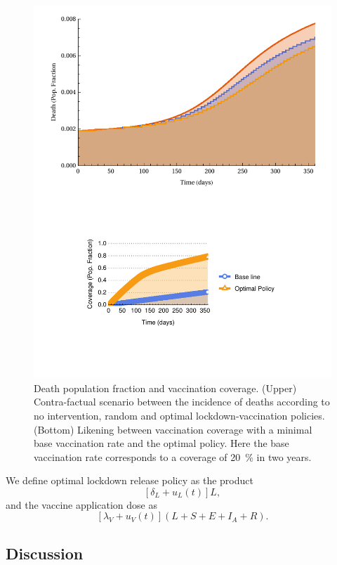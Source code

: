 \begin{figure}
    \centering
    \includegraphics[width=0.7\linewidth]{figs/deathsVaccinationCoverage}
    \caption{Death population fraction and vaccination coverage.
    (Upper) Contra-factual scenario between the incidence of deaths according to
    no intervention, random and optimal lockdown-vaccination policies.
    (Bottom) Likening between vaccination coverage with a minimal base
    vaccination rate and the optimal policy. Here the base vaccination rate
    corresponds to a coverage of \SI{20}{\percent} in two years.
}
    \label{fig:deathsvaccinationcoverage}
\end{figure}

\begin{rmk}
    We define optimal lockdown release policy as the product
    $$[\delta_L + u_L(t)] L,$$ and the vaccine application dose as
    $$
        [\lambda_V + u_V(t)] (L+S+E+I_A+R).
    $$
\end{rmk}

\subsection{Discussion}